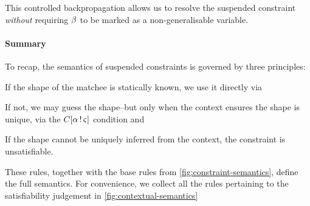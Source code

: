 \documentclass[acmsmall,screen,nonacm]{acmart}
\begin{document}
This controlled backpropagation allows us to resolve the suspended constraint
\emph{without} requiring $\beta$ to be marked as a non-generalisable variable.


\paragraph{Summary}
To recap, the semantics of suspended constraints is governed by three
principles:
\begin{enumerate*}
  \item If the shape of the matchee is statically known, we use it
    directly via 
  \item If not, we may guess the shape--but only when the context ensures
    the shape is unique, via the $C [\alpha \mathop{!} \varsigma]$ condition and 
  \item If the shape cannot be uniquely inferred from the context, the constraint
    is unsatisfiable.
\end{enumerate*}

These rules, together with the base rules from \cref{fig:constraint-semantics},
define the full semantics. For convenience, we collect all the rules pertaining to
the satisfiability judgement in \cref{fig:contextual-semantics}
\end{document}
